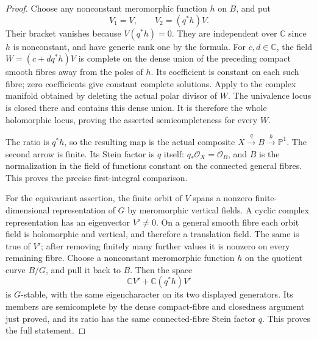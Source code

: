 \begin{proof}
Choose any nonconstant meromorphic function
$h$ on $B$, and put
\[
              V_1=V,\qquad V_2=(q^*h)V.
                                                               \tag{C.FL.4}
\]
Their bracket vanishes because $V(q^*h)=0$.
They are independent over $\mathbb C$ since $h$
is nonconstant, and have generic rank one by
the formula. For $c,d\in\mathbb C$, the field
$W=(c+dq^*h)V$ is complete on the dense union
of the preceding compact smooth fibres away
from the poles of $h$. Its coefficient is
constant on each such fibre; zero coefficients
give constant complete solutions. Apply
\cite[Theorem~3.3]{Guillot2024} to the complex
manifold obtained by deleting the actual polar
divisor of $W$. The univalence locus is closed
there and contains this dense union. It is
therefore the whole holomorphic locus, proving
the asserted semicompleteness for every $W$.

The ratio is $q^*h$, so the resulting map is
the actual composite $X\xrightarrow q B
\xrightarrow h\mathbb P^1$. The second arrow
is finite. Its Stein factor is $q$ itself:
$q_*\mathcal O_X=\mathcal O_B$, and $B$ is
the normalization in the field of functions
constant on the connected general fibres.
This proves the precise first-integral comparison.

For the equivariant assertion, the finite orbit
of $V$ spans a nonzero finite-dimensional
representation of $G$ by meromorphic vertical
fields. A cyclic complex representation has
an eigenvector $V'\ne0$. On a general smooth
fibre each orbit field is holomorphic and
vertical, and therefore a translation field.
The same is true of $V'$; after removing
finitely many further values it is nonzero
on every remaining fibre. Choose a nonconstant
meromorphic function $h$ on the quotient
curve $B/G$, and pull it back to $B$.
Then the space
\[
                  \mathbb C V'+\mathbb C(q^*h)V'
                                                               \tag{C.FL.5}
\]
is $G$-stable, with the same eigencharacter
on its two displayed generators. Its members
are semicomplete by the dense compact-fibre
and closedness argument just proved, and its
ratio has the same connected-fibre Stein
factor $q$. This proves the full statement.
\end{proof}
